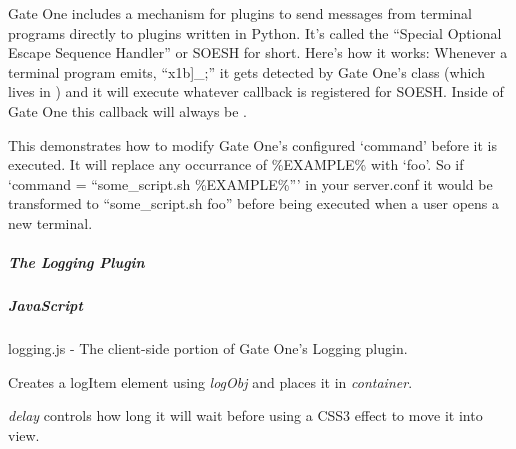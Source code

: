 \documentclass[letterpaper,10pt,openany]{sphinxmanual}
\begin{document}

\begin{fulllineitems}
\label{Applications/terminal/plugin_example:example.example_opt_esc_handler}
Gate One includes a mechanism for plugins to send messages from terminal
programs directly to plugins written in Python.  It's called the ``Special
Optional Escape Sequence Handler'' or SOESH for short.  Here's how it works:
Whenever a terminal program emits, ``x1b{]}\_;'' it gets detected by Gate One's
 class (which lives in ) and it will
execute whatever callback is registered for SOESH.  Inside of Gate One this
callback will always be .

\end{fulllineitems}


\begin{fulllineitems}
\label{Applications/terminal/plugin_example:example.example_command_hook}
This demonstrates how to modify Gate One's configured `command' before it is
executed.  It will replace any occurrance of \%EXAMPLE\% with `foo'.  So if
`command = ``some\_script.sh \%EXAMPLE\%''' in your server.conf it would be
transformed to ``some\_script.sh foo'' before being executed when a user opens
a new terminal.

\end{fulllineitems}



\subparagraph{The Logging Plugin}
\label{Applications/terminal/plugin_logging::doc}\label{Applications/terminal/plugin_logging:the-logging-plugin}

\subparagraph{JavaScript}
\label{Applications/terminal/plugin_logging:javascript}
logging.js - The client-side portion of Gate One's Logging plugin.

\begin{fulllineitems}
\label{Applications/terminal/plugin_logging:GateOne.TermLogging.createLogItem}
Creates a logItem element using \emph{logObj} and places it in \emph{container}.

\emph{delay} controls how long it will wait before using a CSS3 effect to move it into view.

\end{fulllineitems}
\end{document}
